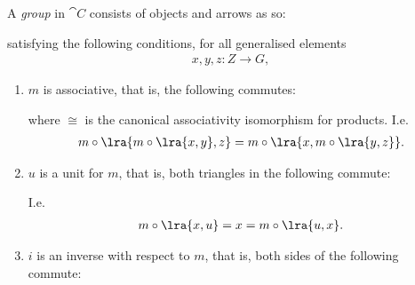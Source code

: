 \documentclass{article}
\begin{document}
\begin{definition}
	A \emph{group} in $\cat C$ consists of objects and arrows as so:

	\begin{center}
	\end{center}

	satisfying the following conditions, for all generalised elements
	\begin{align*}
		x,y,z:Z\to G,
	\end{align*}

	\begin{enumerate}
		\item $m$ is associative, that is, the following commutes: \begin{center}
		      \end{center}
		      where $\cong$ is the canonical associativity isomorphism for products. I.e. \begin{align*}
			      m\circ \lra{m\circ \lra{x,y}, z} = m\circ\lra{x,m\circ\lra{y,z}}.
		      \end{align*}
		\item $u$ is a unit for $m$, that is, both triangles in the following commute: \begin{center}
		      \end{center}
		      I.e. \begin{align*}
			      m\circ\lra{x,u} = x = m\circ\lra{u, x}.
		      \end{align*}
		\item $i$ is an inverse with respect to $m$, that is, both sides of the following commute: \begin{center}

\end{center}
\end{enumerate}
\end{definition}
\end{document}
